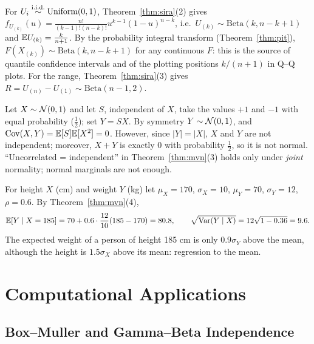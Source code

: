 \documentclass[main.tex]{subfiles}
\begin{document}
\begin{example}\label{ex:uniform-sira}
For $U_i\overset{\text{i.i.d.}}{\sim}\text{Uniform}(0,1)$, Theorem~\ref{thm:sira}(2) gives $f_{U_{(k)}}(u)=\frac{n!}{(k-1)!(n-k)!}u^{k-1}(1-u)^{n-k}$, i.e.\ $U_{(k)}\sim\text{Beta}(k,n-k+1)$ and $\mathbb{E} U_{(k)}=\frac{k}{n+1}$. By the probability integral transform (Theorem~\ref{thm:pit}), $F(X_{(k)})\sim\text{Beta}(k,n-k+1)$ for any continuous $F$: this is the source of quantile confidence intervals and of the plotting positions $k/(n+1)$ in Q--Q plots. For the range, Theorem~\ref{thm:sira}(3) gives $R=U_{(n)}-U_{(1)}\sim\text{Beta}(n-1,2)$.
\end{example}

\begin{example}\label{ex:normal-degil}
Let $X\sim\mathcal{N}(0,1)$ and let $S$, independent of $X$, take the values $+1$ and $-1$ with equal probability ($\frac12$); set $Y=SX$. By symmetry $Y\sim\mathcal{N}(0,1)$, and $\operatorname{Cov}(X,Y)=\mathbb{E}[S]\mathbb{E}[X^2]=0$. However, since $|Y|=|X|$, $X$ and $Y$ are not independent; moreover, $X+Y$ is exactly $0$ with probability $\frac12$, so it is not normal. ``Uncorrelated = independent'' in Theorem~\ref{thm:mvn}(3) holds only under \emph{joint} normality; normal marginals are not enough.
\end{example}

\begin{example}
For height $X$ (cm) and weight $Y$ (kg) let $\mu_X=170$, $\sigma_X=10$, $\mu_Y=70$, $\sigma_Y=12$, $\rho=0.6$. By Theorem~\ref{thm:mvn}(4),
\[
\mathbb{E}[Y\mid X=185]=70+0.6\cdot\frac{12}{10}(185-170)=80.8,\qquad\sqrt{\operatorname{Var}(Y\mid X)}=12\sqrt{1-0.36}=9.6 .
\]
The expected weight of a person of height 185 cm is only $0.9\sigma_Y$ above the mean, although the height is $1.5\sigma_X$ above its mean: regression to the mean.
\end{example}

\section{Computational Applications}

\subsection{Box--Muller and Gamma--Beta Independence}
\end{document}
